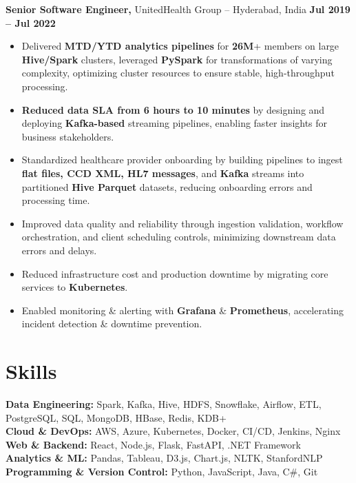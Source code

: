 \documentclass[letterpaper]{article}
\begin{document}
\textbf{Senior Software Engineer,} UnitedHealth Group -- Hyderabad, India \hfill \textbf{Jul 2019 -- Jul 2022} \\
\vspace{2pt}
\begin{itemize}
  \item Delivered \textbf{MTD/YTD analytics pipelines} for \textbf{26M}+ members on large \textbf{Hive/Spark} clusters, leveraged \textbf{PySpark} for transformations of varying complexity, optimizing cluster resources to ensure stable, high-throughput processing.
  \item \textbf{Reduced data SLA from 6 hours to 10 minutes} by designing and deploying \textbf{Kafka-based} streaming pipelines, enabling faster insights for business stakeholders.
  \item Standardized healthcare provider onboarding by building pipelines to ingest \textbf{flat files, CCD XML, HL7 messages}, and \textbf{Kafka} streams into partitioned \textbf{Hive Parquet} datasets, reducing onboarding errors and processing time.
  \item Improved data quality and reliability through ingestion validation, workflow orchestration, and client scheduling controls, minimizing downstream data errors and delays.
  \item Reduced infrastructure cost and production downtime by migrating core services to \textbf{Kubernetes}.
  \item Enabled monitoring \& alerting with \textbf{Grafana} \& \textbf{Prometheus}, accelerating incident detection \& downtime prevention.
\end{itemize}

\vspace{0pt}

\section*{Skills}
\textbf{Data Engineering:} Spark, Kafka, Hive, HDFS, Snowflake, Airflow, ETL, PostgreSQL, SQL, MongoDB, HBase, Redis, KDB+ \\
\textbf{Cloud \& DevOps:} AWS, Azure, Kubernetes, Docker, CI/CD, Jenkins, Nginx \\
\textbf{Web \& Backend:} React, Node.js, Flask, FastAPI, .NET Framework \\
\textbf{Analytics \& ML:} Pandas, Tableau, D3.js, Chart.js, NLTK, StanfordNLP \\
\textbf{Programming \& Version Control:} Python, JavaScript, Java, C\#, Git
\end{document}

